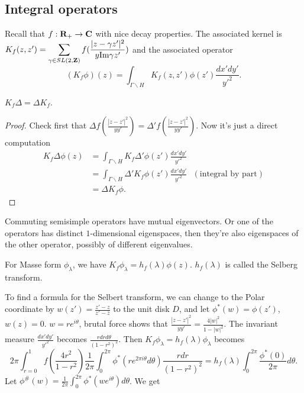 \documentclass[../main.tex]{subfiles}
\begin{document}
\subsection{Integral operators}
Recall that $f:\mathbf{R}_{+}\rightarrow \mathbf{C}$ with nice decay properties. The associated kernel is $K_{f}(z, z') = \displaystyle\sum_{\gamma \in SL(2, \mathbf{Z})}f(\frac{|z-\gamma z'|^{2}}{y\mathrm{Im}\gamma z'})$ and the associated operator $$(K_{f}\phi)(z)=\displaystyle \int_{\Gamma\backslash H}K_{f}(z, z')\phi(z')\frac{dx'dy'}{y'^{2}}.$$
\begin{proposition}
$K_{f}\Delta = \Delta K_{f}$.
\end{proposition}
\begin{proof}
Check first that $\Delta f(\frac{|z-z'|^{2}}{yy'})=\Delta'f(\frac{|z-z'|^{2}}{yy'})$. Now it's just a direct computation
$$\begin{align*}
    K_{f}\Delta\phi(z) &= \int_{\Gamma\backslash H}K_{f}\Delta'\phi(z')\frac{dx'dy'}{y'^{2}}\\
    &=\int_{\Gamma\backslash H}\Delta' K_{f}\phi(z')\frac{dx'dy'}{y'^{2}} \text{ }(\text{integral by part})\\
    &= \Delta K_{f}\phi.
\end{align*}$$
\end{proof}
\begin{remark}
Commuting semisimple operators have mutual eigenvectors. Or one of the operators has distinct $1$-dimensional eigenspaces, then they're also eigenspaces of the other operator, possibly of different eigenvalues.
\end{remark}
\begin{definition}
For Masse form $\phi_{\lambda}$, we have $K_{f}\phi_{\lambda}= h_{f}(\lambda)\phi(z)$. $h_{f}(\lambda)$ is called the Selberg transform.
\end{definition}
To find a formula for the Selbert transform, we can change to the Polar coordinate by $w(z')=\frac{z'-z}{z'-\overline{z}}$ to the unit disk $D$, and let $\phi^{*}(w)=\phi(z')$, $w(z)=0$. $w=re^{i\theta}$, brutal force shows that $\frac{|z-z'|^{2}}{yy'}=\frac{4|w|^{2}}{1-|w|^{2}}$. The invariant measure $\frac{dx'dy'}{y'^{2}}$ becomes $\frac{rdrd\theta}{(1-r^{2})^{2}}$. Then $K_{f}\phi_{\lambda}=h_{f}(\lambda)\phi_{\lambda}$ becomes
$$2\pi\int_{r=0}^{1}f(\frac{4r^{2}}{1-r^{2}})\frac{1}{2\pi}\int_{0}^{2\pi}\phi^{*}(re^{2\pi i \theta}d\theta)\frac{rdr}{(1-r^{2})^{2}}=h_{f}(\lambda)\int_{0}^{2\pi}\frac{\phi^{*}(0)}{2\pi}d\theta.$$
Let $\phi^{\#}(w)=\frac{1}{2\pi}\int_{0}^{2\pi}\phi^{*}(we^{i\theta})d\theta$. We get 
\end{document}
